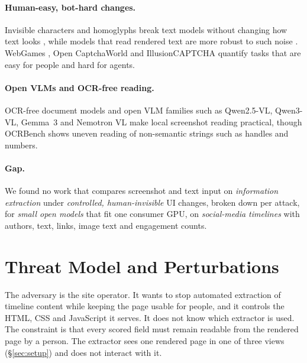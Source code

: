 \documentclass[letterpaper,10pt,twocolumn]{article}
\begin{document}
\paragraph{Human-easy, bot-hard changes.}
Invisible characters and homoglyphs break text models without changing how text
looks \citep{boucher2022badcharacters}, while models that read rendered text are
more robust to such noise \citep{salesky2021robust,rust2022pixel}. WebGames
\citep{thomas2025webgames}, Open CaptchaWorld \citep{luo2025opencaptchaworld}
and IllusionCAPTCHA \citep{ding2025illusioncaptcha} quantify tasks that are
easy for people and hard for agents.

\paragraph{Open VLMs and OCR-free reading.}
OCR-free document models \citep{kim2022donut} and open VLM families such as
Qwen2.5-VL, Qwen3-VL, Gemma~3 and Nemotron VL
\citep{bai2025qwen25vl,bai2025qwen3vl,gemmateam2025gemma3,nvidia2025nemotronvl}
make local screenshot reading practical, though OCRBench
\citep{liu2023ocrbench} shows uneven reading of non-semantic strings such as
handles and numbers.

\paragraph{Gap.}
We found no work that compares screenshot and text input on \emph{information
extraction} under \emph{controlled, human-invisible} UI changes, broken down per
attack, for \emph{small open models} that fit one consumer GPU, on
\emph{social-media timelines} with authors, text, links, image text and
engagement counts.

\section{Threat Model and Perturbations}

The adversary is the site operator. It wants to stop automated extraction of
timeline content while keeping the page usable for people, and it controls the
HTML, CSS and JavaScript it serves. It does not know which extractor is used.
The constraint is that every scored field must remain readable from the
rendered page by a person. The extractor sees one rendered page in one of
three views (\S\ref{sec:setup}) and does not interact with it.
\end{document}
